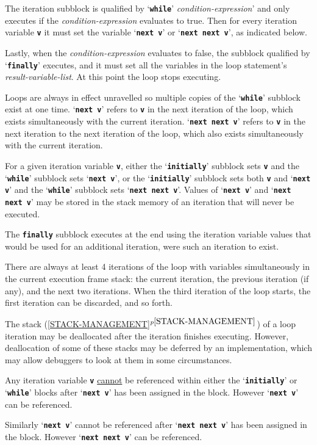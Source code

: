 \documentclass[12pt]{article}
\makeatletter
\newcommand{\TT}[1]{{\tt \bfseries #1}}
\newcommand{\ttkey}[1]{\TT{#1}\index{#1@{\tt #1}}}
\newcommand{\itemref}[1]{\ref{#1}$^{p\pageref{#1}}$}
\makeatother
\begin{document}
The iteration subblock is qualified by `\ttkey{while}'
{\em condition-expression}' and only executes if the
{\em condition-expression} evaluates to true.  Then
for every iteration variable \TT{v}
it must set the variable `\TT{next v}' or `\TT{next next v}',
as indicated below.

Lastly, when
the {\em condition-expression} evaluates to false, the
subblock qualified by `\ttkey{finally}'
executes, and it must set all the variables in the
loop statement's {\em result-variable-list}.  At this point the loop stops
executing.

Loops are always in effect unravelled so multiple copies of
the `\TT{while}' subblock exist at one time.
`\TT{next v}' refers to \TT{v} in the
next iteration of the loop, which exists simultaneously with
the current iteration.  `\TT{next next v}' refers to \TT{v}
in the next iteration to the next iteration of the loop, which
also exists simultaneously with the current iteration.

For a given iteration variable \TT{v},
either the `\TT{initially}' subblock sets \TT{v}
and the `\TT{while}' subblock sets `\TT{next v}',
or the `\TT{initially}' subblock sets both \TT{v} and `\TT{next v}'
and the `\TT{while}' subblock sets `\TT{next next v}'.
Values of `\TT{next v}' and `\TT{next next v}' may be stored in
the stack memory of an iteration that will never be executed.

The \TT{finally} subblock executes at the end using the iteration
variable values that would be used for an additional iteration,
were such an iteration to exist.

There are always at least 4 iterations of the loop with variables
simultaneously in the current execution frame stack: the current iteration,
the previous iteration (if any), and the next two iterations.
When the third iteration of the loop starts, the first
iteration can be discarded, and so forth.

The stack (\itemref{STACK-MANAGEMENT})
of a loop iteration may be deallocated after the
iteration finishes executing.
However, deallocation of some of these stacks may be deferred by
an implementation, which may allow debuggers to look at them
in some circumstances.

Any iteration variable \TT{v} \underline{cannot} be referenced
within either the `\TT{initially}' or `\TT{while}' blocks
after `\TT{next v}' has been assigned in the block.
However `\TT{next v}' can be referenced.

Similarly `\TT{next v}' cannot be referenced
after `\TT{next next v}' has been assigned in the block.
However `\TT{next next v}' can be referenced.
\end{document}
